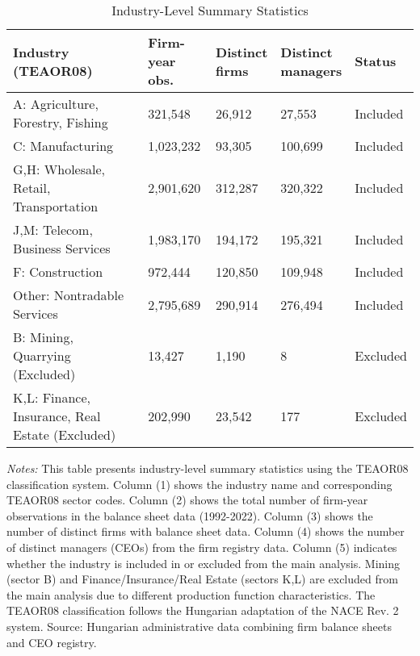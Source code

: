 \begin{table}[htbp]
\centering
\caption{Industry-Level Summary Statistics}
\label{tab:industry_stats}
\begin{tabular}{*{5}{l}}
\toprule
Industry (TEAOR08) & \shortstack{Firm-year\\obs.} & \shortstack{Distinct\\firms} & \shortstack{Distinct\\managers} & Status \\
\midrule
A: Agriculture, Forestry, Fishing &      321,548 &       26,912 &       27,553 & Included \\
C: Manufacturing &    1,023,232 &       93,305 &      100,699 & Included \\
G,H: Wholesale, Retail, Transportation &    2,901,620 &      312,287 &      320,322 & Included \\
J,M: Telecom, Business Services &    1,983,170 &      194,172 &      195,321 & Included \\
F: Construction &      972,444 &      120,850 &      109,948 & Included \\
Other: Nontradable Services &    2,795,689 &      290,914 &      276,494 & Included \\
\midrule
B: Mining, Quarrying (Excluded) &       13,427 &        1,190 &            8 & Excluded \\
K,L: Finance, Insurance, Real Estate (Excluded) &      202,990 &       23,542 &          177 & Excluded \\
\bottomrule
\end{tabular}
\begin{minipage}{\textwidth}
\footnotesize
\textit{Notes:} This table presents industry-level summary statistics using the TEAOR08 classification system. Column (1) shows the industry name and corresponding TEAOR08 sector codes. Column (2) shows the total number of firm-year observations in the balance sheet data (1992-2022). Column (3) shows the number of distinct firms with balance sheet data. Column (4) shows the number of distinct managers (CEOs) from the firm registry data. Column (5) indicates whether the industry is included in or excluded from the main analysis. Mining (sector B) and Finance/Insurance/Real Estate (sectors K,L) are excluded from the main analysis due to different production function characteristics. The TEAOR08 classification follows the Hungarian adaptation of the NACE Rev. 2 system. Source: Hungarian administrative data combining firm balance sheets and CEO registry.
\end{minipage}
\end{table}
